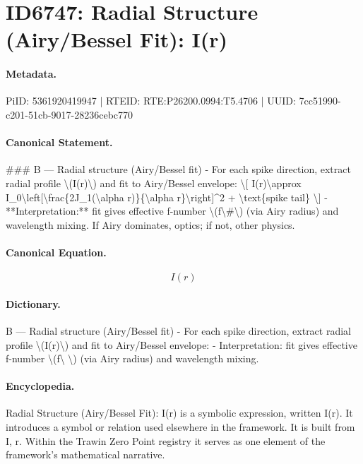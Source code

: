 \section*{ID6747: Radial Structure (Airy/Bessel Fit): I(r)}
\paragraph{Metadata.}
PiID: 5361920419947 | RTEID: RTE:P26200.0994:T5.4706 | UUID: 7cc51990-c201-51cb-9017-28236cebc770

\paragraph{Canonical Statement.}
\#\#\# B — Radial structure (Airy/Bessel fit) - For each spike direction, extract radial profile \textbackslash{}(I(r)\textbackslash{}) and fit to Airy/Bessel envelope: \textbackslash{}[ I(r)\textbackslash{}approx I\_0\textbackslash{}left[\textbackslash{}frac\{2J\_1(\textbackslash{}alpha r)\}\{\textbackslash{}alpha r\}\textbackslash{}right]\textasciicircum{}2 + \textbackslash{}text\{spike tail\} \textbackslash{}] - **Interpretation:** fit gives effective f-number \textbackslash{}(f\textbackslash{}\#\textbackslash{}) (via Airy radius) and wavelength mixing. If Airy dominates, optics; if not, other physics.

\paragraph{Canonical Equation.}
\[
I(r)
\]

\paragraph{Dictionary.}
B — Radial structure (Airy/Bessel fit) - For each spike direction, extract radial profile \textbackslash{}(I(r)\textbackslash{}) and fit to Airy/Bessel envelope: - Interpretation: fit gives effective f-number \textbackslash{}(f\textbackslash{} \textbackslash{}) (via Airy radius) and wavelength mixing.

\paragraph{Encyclopedia.}
Radial Structure (Airy/Bessel Fit): I(r) is a symbolic expression, written I(r). It introduces a symbol or relation used elsewhere in the framework. It is built from I, r. Within the Trawin Zero Point registry it serves as one element of the framework's mathematical narrative.
